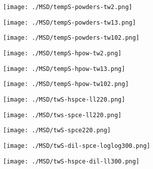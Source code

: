 \newpage

\begin{figure}[H]
\centering	
    \texttt{[image: ./MSD/tempS-powders-tw2.png]}
    
    \vspace{0.8cm}

    \texttt{[image: ./MSD/tempS-powders-tw13.png]}

    \vspace{0.8cm}

    \texttt{[image: ./MSD/tempS-powders-tw102.png]}
\end{figure}

\newpage

\begin{figure}[H]
\centering	
    \texttt{[image: ./MSD/tempS-hpow-tw2.png]}
    
    \vspace{0.8cm}

    \texttt{[image: ./MSD/tempS-hpow-tw13.png]}

    \vspace{0.8cm}

    \texttt{[image: ./MSD/tempS-hpow-tw102.png]}
\end{figure}

\begin{figure}[H]
\centering	
    \texttt{[image: ./MSD/twS-hspce-ll220.png]}
    
    \vspace{0.8cm}

    \texttt{[image: ./MSD/tws-spce-ll220.png]}

    \vspace{0.8cm}

    \texttt{[image: ./MSD/twS-spce220.png]}
\end{figure}

\begin{figure}[H]
\centering	
    \texttt{[image: ./MSD/twS-dil-spce-loglog300.png]}
    
    \vspace{0.8cm}

    \texttt{[image: ./MSD/twS-hspce-dil-ll300.png]}
\end{figure}

%
%


